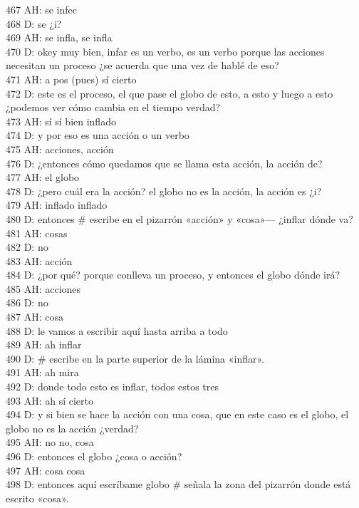 467 AH: se infec\\
468 D: se ¿i?\\
469 AH: se infla, se infla\\
470 D: okey muy bien, infar es un verbo, es un verbo porque las acciones necesitan un proceso ¿se acuerda que una vez de hablé de eso?\\
471 AH: a pos (pues) sí cierto\\
472 D: este es el proceso, el que pase el globo de esto, a esto y luego a esto ¿podemos ver cómo cambia en el tiempo verdad?\\
473 AH: sí sí bien inflado\\
474 D: y por eso es una acción o un verbo\\
475 AH: acciones, acción\\
476 D: ¿entonces cómo quedamos que se llama esta acción, la acción de?\\
477 AH: el globo\\
478 D: ¿pero cuál era la acción? el globo no es la acción, la acción es ¿i?\\
479 AH: inflado inflado\\
480 D: entonces \# escribe en el pizarrón «acción» y «cosa»--- ¿inflar dónde va?\\
481 AH: cosas\\
482 D: no\\
483 AH: acción\\
484 D: ¿por qué? porque conlleva un proceso, y entonces el globo dónde irá?\\
485 AH: acciones\\
486 D: no\\
487 AH: cosa\\
488 D: le vamos a escribir aquí hasta arriba a todo\\
489 AH: ah inflar\\
490 D: \# escribe en la parte superior de la lámina «inflar».\\
491 AH: ah mira\\
492 D: donde todo esto es inflar, todos estos tres\\
493 AH: ah sí cierto\\
494 D: y si bien se hace la acción con una cosa, que en este caso es el globo, el globo no es la acción ¿verdad?\\
495 AH: no no, cosa\\
496 D: entonces el globo ¿cosa o acción?\\
497 AH: cosa cosa\\
498 D: entonces aquí escríbame globo \# señala la zona del pizarrón donde está escrito «cosa».\\
